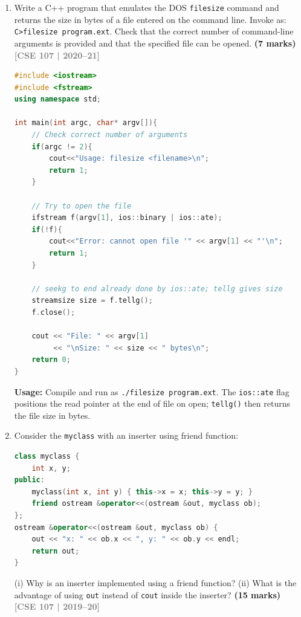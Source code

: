 \documentclass[12pt,a3paper]{article}
\newcommand{\yr}[1]{\hfill\textcolor{gray}{\small\textbf{[#1]}}}
\newcommand{\mk}[1]{\textcolor{orange!70!black}{\small\textbf{(#1 marks)}}}
\begin{document}
\begin{enumerate}
\begin{tcolorbox}[enhanced,breakable,ansbox,colback=cA!4,colframe=cA,
  boxrule=0.8pt,arc=5pt,
  title={\textbf{Answer --- inventory class inserter and extractor}},
  fonttitle=\bfseries\color{white},colbacktitle=cA]
\begin{lstlisting}[language=C++]
int main(){
    inventory inv;
    cin  >> inv;   // prompt and read
    cout << inv;   // display
    return 0;
}
\end{lstlisting}

\end{tcolorbox}


\item Write a C++ program that emulates the DOS \texttt{filesize} command and returns the size in bytes of a file entered on the command line. Invoke as: \texttt{C>filesize program.ext}. Check that the correct number of command-line arguments is provided and that the specified file can be opened. \mk{7}
\yr{CSE 107 | 2020--21}
\begin{tcolorbox}[enhanced,breakable,ansbox,colback=cA!4,colframe=cA,
  boxrule=0.8pt,arc=5pt,
  title={\textbf{Answer --- filesize command emulation}},
  fonttitle=\bfseries\color{white},colbacktitle=cA]

\begin{lstlisting}[language=C++]
#include <iostream>
#include <fstream>
using namespace std;

int main(int argc, char* argv[]){
    // Check correct number of arguments
    if(argc != 2){
        cout<<"Usage: filesize <filename>\n";
        return 1;
    }

    // Try to open the file
    ifstream f(argv[1], ios::binary | ios::ate);
    if(!f){
        cout<<"Error: cannot open file '" << argv[1] << "'\n";
        return 1;
    }

    // seekg to end already done by ios::ate; tellg gives size
    streamsize size = f.tellg();
    f.close();

    cout << "File: " << argv[1]
         << "\nSize: " << size << " bytes\n";
    return 0;
}
\end{lstlisting}

\textbf{Usage:} Compile and run as \texttt{./filesize program.ext}.
The \texttt{ios::ate} flag positions the read pointer at the end
of file on open; \texttt{tellg()} then returns the file size in bytes.

\end{tcolorbox}



\item Consider the \texttt{myclass} with an inserter using friend function:
\begin{lstlisting}[language=C++]
class myclass {
    int x, y;
public:
    myclass(int x, int y) { this->x = x; this->y = y; }
    friend ostream &operator<<(ostream &out, myclass ob);
};
ostream &operator<<(ostream &out, myclass ob) {
    out << "x: " << ob.x << ", y: " << ob.y << endl;
    return out;
}
\end{lstlisting}
(i) Why is an inserter implemented using a friend function? (ii) What is the advantage of using \texttt{out} instead of \texttt{cout} inside the inserter? \mk{15}
\yr{CSE 107 | 2019--20}


\end{enumerate}
\end{document}
